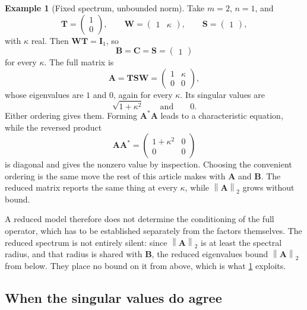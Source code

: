 \documentclass[11pt]{article}
\newcommand{\I}{\mathbf{I}}
\newcommand{\mat}[1]{\mathbf{#1}}
\newcommand{\norm}[1]{\left\lVert #1\right\rVert}
\theoremstyle{definition}
\newtheorem{example}[example]{Example}
\theoremstyle{remark}
\begin{document}
\begin{example}[Fixed spectrum, unbounded norm]
\label{ex:unbounded-norm}
Take \(m=2\), \(n=1\), and
\[
  \mat{T}=\begin{pmatrix}1\\0\end{pmatrix},
  \qquad
  \mat{W}=\begin{pmatrix}1&\kappa\end{pmatrix},
  \qquad
  \mat{S}=\begin{pmatrix}1\end{pmatrix},
\]
with \(\kappa\) real. Then \(\mat{W}\mat{T}=\I_1\), so
\[
  \mat{B}=\mat{C}=\mat{S}=\begin{pmatrix}1\end{pmatrix}
\]
for every \(\kappa\). The full matrix is
\[
  \mat{A}=\mat{T}\mat{S}\mat{W}
  =\begin{pmatrix}1&\kappa\\0&0\end{pmatrix},
\]
whose eigenvalues are \(1\) and \(0\), again for every \(\kappa\). Its singular values are
\[
  \sqrt{1+\kappa^{2}}
  \qquad\text{and}\qquad
  0.
\]
Either ordering gives them. Forming \(\mat{A}^{*}\mat{A}\) leads to a characteristic equation, while the reversed product
\[
  \mat{A}\mat{A}^{*}
  =\begin{pmatrix}1+\kappa^{2}&0\\0&0\end{pmatrix}
\]
is diagonal and gives the nonzero value by inspection. Choosing the convenient ordering is the same move the rest of this article makes with \(\mat{A}\) and \(\mat{B}\).
The reduced matrix reports the same thing at every \(\kappa\), while \(\norm{\mat{A}}_2\) grows without bound.
\end{example}

A reduced model therefore does not determine the conditioning of the full operator, which has to be established separately from the factors themselves. The reduced spectrum is not entirely silent: since \(\norm{\mat{A}}_2\) is at least the spectral radius, and that radius is shared with \(\mat{B}\), the reduced eigenvalues bound \(\norm{\mat{A}}_2\) from below. They place no bound on it from above, which is what \cref{ex:unbounded-norm} exploits.

\subsection{When the singular values do agree}
\end{document}
